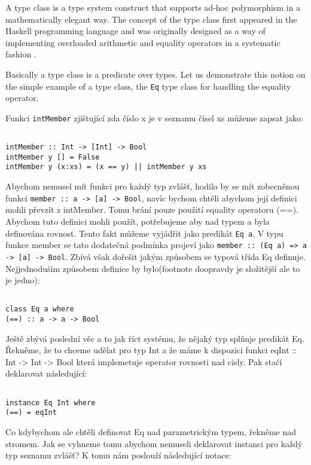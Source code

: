 \documentclass[11pt]{article}
\begin{document}
\begin{article}
A type class is a type system construct that supports ad-hoc polymorphism in a mathematically elegant way. The concept of the type class first appeared in the Haskell programming language \citep{morris2013type} and was originally designed as a way of implementing overloaded arithmetic and equality operators in a systematic fashion \citep{wadler1989make}.

Basically a type class is a predicate over types. Let us demonstrate this notion on the simple example of a type class, the \texttt{Eq} type class for handling the equality operator. 

Funkci \texttt{intMember} zjištující zda číslo x je v seznamu čísel xs můžeme zapsat jako:

\texttt{~\\
intMember :: Int -> [Int] -> Bool\\
intMember y [] = False\\
intMember y (x:xs) = (x == y) || intMember y xs\\} 

Abychom nemusel mít funkci pro každý typ zvlášť, hodilo by se mít zobecněnou funkci \texttt{member :: a -> [a] -> Bool}, navíc bychom chtěli abychom její definici mohli převzít z intMember. Tomu brání pouze použití equality operatoru (==).  Abychom tuto definici mohli použít, potřebujeme aby nad typem a byla definována rovnost. Tento fakt můžeme vyjádřit jako predikát \texttt{Eq a}. 
V typu funkce member se tato dodatečná podmínka projeví jako \texttt{member :: (Eq a) => a -> [a] -> Bool}. Zbívá však dořešit jakým způsobem se typová třída Eq definuje. Nejjednoduším způsobem definice by bylo(footnote doopravdy je složitější ale to je jedno):

\texttt{~\\
class Eq a where\\
 (==) :: a -> a -> Bool\\}

Ještě zbývá poslední věc a to jak říct systému, že nějaký typ splňuje predikát Eq. Řekněme, že to chceme udělat pro typ Int a že máme k dispozici funkci eqInt :: Int -> Int -> Bool která implemetuje operator rovnosti nad cisly. Pak stačí deklarovat následující:

\texttt{~\\
instance Eq Int where\\
 (==) = eqInt\\}

Co kdybychom ale chtěli definovat Eq nad parametrickým typem, řekněme nad stromem. Jak se vyhneme tomu abychom nemuseli deklarovat instanci pro každý typ seznamu zvlášť? K tomu nám poslouží následující notace:


\end{article}
\end{document}
